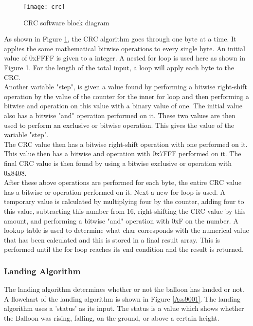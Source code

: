 \documentclass[12pt, letterpaper]{article}
\begin{document}
\begin{figure}[H]
    \centering
    \texttt{[image: crc]}
    \caption{CRC software block diagram}
    \label{Ass4}
\end{figure}

As shown in Figure \ref{Ass4}, the CRC algorithm goes through one byte at a time. It applies the same mathematical bitwise operations to every single byte. An initial value of 0xFFFF is given to a integer. A nested for loop is used here as shown in Figure \ref{Ass4}. For the length of the total input, a loop will apply each byte to the CRC.\\

Another variable "step", is given a value found by performing a bitwise right-shift operation by the value of the counter for the inner for loop and then performing a bitwise and operation on this value with a binary value of one. The initial value also has a bitwise "and" operation performed on it. These two values are then used to perform an exclusive or bitwise operation. This gives the value of the variable "step".\\

The CRC value then has a bitwise right-shift operation with one performed on it. This value then has a bitwise and operation with 0x7FFF performed on it. The final CRC value is then found by using a bitwise exclusive or operation with 0x8408.\\

After these above operations are performed for each byte, the entire CRC value has a bitwise or operation performed on it. Next a new for loop is used. A temporary value is calculated by multiplying four by the counter, adding four to this value, subtracting this number from 16, right-shifting the CRC value by this amount, and performing a bitwise "and" operation with 0xF on the number. A lookup table is used to determine what char corresponds with the numerical value that has been calculated and this is stored in a final result array. This is performed until the for loop reaches its end condition and the result is returned.

\subsubsection{Landing Algorithm}
The landing algorithm determines whether or not the balloon has landed or not. A flowchart of the landing algorithm is shown in Figure \ref{Ass9001}. The landing algorithm uses a 'status' as its input. The status is a value which shows whether the Balloon was rising, falling, on the ground, or above a certain height.
\end{document}
